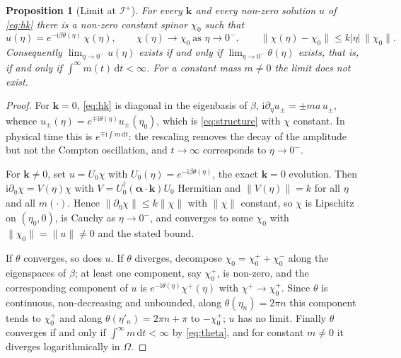 \documentclass[11pt,a4paper]{article}
\newtheorem{proposition}{Proposition}
\theoremstyle{definition}
\newcommand{\scri}{\mathscr{I}^{+}}
\newcommand{\dd}{\mathrm{d}}
\newcommand{\ii}{\mathrm{i}}
\begin{document}
\begin{proposition}[Limit at $\scri$]
\label{prop:dirac}
For every $\mathbf{k}$ and every non-zero solution $u$ of \eqref{eq:hk} there is a non-zero constant spinor $\chi_{0}$ such that
\begin{equation}
u(\eta)=e^{-\ii\beta\theta(\eta)}\,\chi(\eta),\qquad \chi(\eta)\to\chi_{0}\ \text{as }\eta\to0^{-},\qquad \|\chi(\eta)-\chi_{0}\|\le k|\eta|\,\|\chi_{0}\|.
\label{eq:structure}
\end{equation}
Consequently $\lim_{\eta\to0^{-}}u(\eta)$ exists if and only if $\lim_{\eta\to0^{-}}\theta(\eta)$ exists, that is, if and only if $\int^{\infty}m(t)\,\dd t<\infty$. For a constant mass $m\neq0$ the limit does not exist.
\end{proposition}
\begin{proof}
For $\mathbf{k}=0$, \eqref{eq:hk} is diagonal in the eigenbasis of $\beta$, $\ii\partial_{\eta}u_{\pm}=\pm m a\,u_{\pm}$, whence $u_{\pm}(\eta)=e^{\mp\ii\theta(\eta)}u_{\pm}(\eta_{0})$, which is \eqref{eq:structure} with $\chi$ constant. In physical time this is $e^{\mp\ii\int m\,\dd t}$: the rescaling removes the decay of the amplitude but not the Compton oscillation, and $t\to\infty$ corresponds to $\eta\to0^{-}$.

For $\mathbf{k}\neq0$, set $u=U_{0}\chi$ with $U_{0}(\eta)=e^{-\ii\beta\theta(\eta)}$, the exact $\mathbf{k}=0$ evolution. Then $\ii\partial_{\eta}\chi=V(\eta)\chi$ with $V=U_{0}^{\dagger}(\boldsymbol\alpha\cdot\mathbf{k})U_{0}$ Hermitian and $\|V(\eta)\|=k$ for all $\eta$ and all $m(\cdot)$. Hence $\|\partial_{\eta}\chi\|\le k\|\chi\|$ with $\|\chi\|$ constant, so $\chi$ is Lipschitz on $(\eta_{0},0)$, is Cauchy as $\eta\to0^{-}$, and converges to some $\chi_{0}$ with $\|\chi_{0}\|=\|u\|\neq0$ and the stated bound.

If $\theta$ converges, so does $u$. If $\theta$ diverges, decompose $\chi_{0}=\chi_{0}^{+}+\chi_{0}^{-}$ along the eigenspaces of $\beta$; at least one component, say $\chi_{0}^{+}$, is non-zero, and the corresponding component of $u$ is $e^{-\ii\theta(\eta)}\chi^{+}(\eta)$ with $\chi^{+}\to\chi_{0}^{+}$. Since $\theta$ is continuous, non-decreasing and unbounded, along $\theta(\eta_{n})=2\pi n$ this component tends to $\chi_{0}^{+}$ and along $\theta(\eta'_{n})=2\pi n+\pi$ to $-\chi_{0}^{+}$; $u$ has no limit. Finally $\theta$ converges if and only if $\int^{\infty}m\,\dd t<\infty$ by \eqref{eq:theta}, and for constant $m\neq0$ it diverges logarithmically in $\Omega$.
\end{proof}
\end{document}
